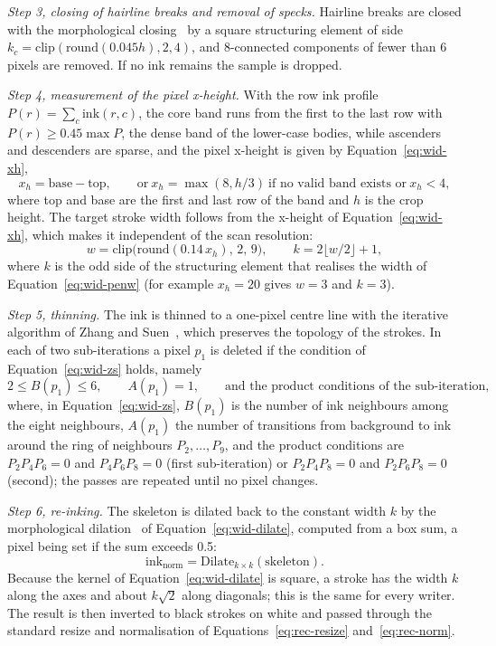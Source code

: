 \emph{Step 3, closing of hairline breaks and removal of specks.} Hairline breaks are closed with the morphological closing~\cite{haralick1987} by a square structuring element of side $k_c=\mathrm{clip}(\mathrm{round}(0.045h),2,4)$, and 8-connected components of fewer than 6 pixels are removed. If no ink remains the sample is dropped.

\emph{Step 4, measurement of the pixel x-height.} With the row ink profile $P(r)=\sum_c\mathrm{ink}(r,c)$, the core band runs from the first to the last row with $P(r)\ge0.45\max P$, the dense band of the lower-case bodies, while ascenders and descenders are sparse, and the pixel x-height is given by Equation~\ref{eq:wid-xh},
\begin{equation}
x_h=\text{base}-\text{top},\qquad\text{or}\ x_h=\max(8,h/3)\ \text{if no valid band exists or}\ x_h<4,
\label{eq:wid-xh}
\end{equation}
where top and base are the first and last row of the band and $h$ is the crop height.
The target stroke width follows from the x-height of Equation~\ref{eq:wid-xh}, which makes it independent of the scan resolution:
\begin{equation}
w=\mathrm{clip}\bigl(\mathrm{round}(0.14\,x_h),\,2,\,9\bigr),\qquad k=2\lfloor w/2\rfloor+1,
\label{eq:wid-penw}
\end{equation}
where $k$ is the odd side of the structuring element that realises the width of Equation~\ref{eq:wid-penw} (for example $x_h=20$ gives $w=3$ and $k=3$).

\emph{Step 5, thinning.} The ink is thinned to a one-pixel centre line with the iterative algorithm of Zhang and Suen~\cite{zhang1984}, which preserves the topology of the strokes.
In each of two sub-iterations a pixel $p_1$ is deleted if the condition of Equation~\ref{eq:wid-zs} holds, namely
\begin{equation}
2\le B(p_1)\le6,\qquad A(p_1)=1,\qquad\text{and the product conditions of the sub-iteration,}
\label{eq:wid-zs}
\end{equation}
where, in Equation~\ref{eq:wid-zs}, $B(p_1)$ is the number of ink neighbours among the eight neighbours, $A(p_1)$ the number of transitions from background to ink around the ring of neighbours $P_2,\ldots,P_9$, and the product conditions are $P_2P_4P_6=0$ and $P_4P_6P_8=0$ (first sub-iteration) or $P_2P_4P_8=0$ and $P_2P_6P_8=0$ (second); the passes are repeated until no pixel changes.

\emph{Step 6, re-inking.} The skeleton is dilated back to the constant width $k$ by the morphological dilation~\cite{haralick1987} of Equation~\ref{eq:wid-dilate}, computed from a box sum, a pixel being set if the sum exceeds 0.5:
\begin{equation}
\mathrm{ink}_{\mathrm{norm}}=\mathrm{Dilate}_{k\times k}(\mathrm{skeleton}).
\label{eq:wid-dilate}
\end{equation}
Because the kernel of Equation~\ref{eq:wid-dilate} is square, a stroke has the width $k$ along the axes and about $k\sqrt2$ along diagonals; this is the same for every writer.
The result is then inverted to black strokes on white and passed through the standard resize and normalisation of Equations~\ref{eq:rec-resize} and~\ref{eq:rec-norm}.

